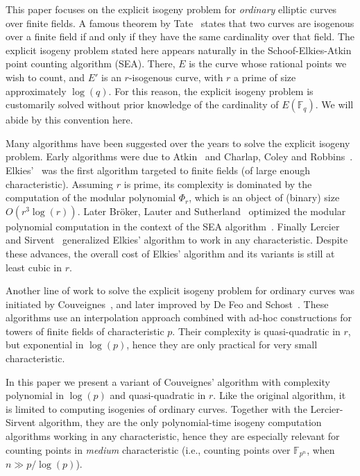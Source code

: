 \documentclass{lms}
\newcommand{\F}{\mathbb{F}}
\begin{document}
This paper focuses on the explicit isogeny problem for \emph{ordinary}
elliptic curves over finite fields. A famous theorem by Tate~\cite{tate1966endomorphisms} states
that two curves are isogenous over a finite field if and only if they
have the same cardinality over that field. The explicit isogeny
problem stated here appears naturally in the Schoof-Elkies-Atkin point
counting algorithm (SEA). There, $E$ is the curve whose rational points
we wish to count, and $E'$ is an $r$-isogenous curve, with $r$
a prime of size approximately $\log(q)$. For this reason, the explicit
isogeny problem is customarily solved without prior knowledge of the
cardinality of $E(\F_q)$. We will abide by this convention here.

Many algorithms
have been suggested over the years to solve the explicit isogeny
problem. Early algorithms were due to Atkin~\cite{atkin91} and
Charlap, Coley and
Robbins~\cite{charlap1991enumeration}. Elkies'~\cite{elkies98,Bostan}
was the first algorithm targeted to finite fields (of large enough
characteristic). Assuming $r$ is prime, its complexity is dominated by
the computation of the modular polynomial $\Phi_r$, which is an object
of (binary) size $O(r^3\log(r))$. Later Bröker, Lauter and
Sutherland~\cite{sutherland10:modpol} optimized the modular polynomial
computation in the context of the SEA
algorithm~\cite{sutherland2013evaluation}. Finally Lercier and Sirvent~\cite{lercier+sirvent08,1602.00244}
generalized Elkies' algorithm to work in any characteristic. Despite
these advances, the overall cost of Elkies' algorithm and its
variants is still at least cubic in $r$.

Another line of work to solve the explicit isogeny problem for ordinary curves was
initiated by Couveignes~\cite{couveignes94,couveignes96,couveignes00},
and later improved by De Feo and Schost~\cite{df10,df+schost12}. These
algorithms use an interpolation approach combined with ad-hoc
constructions for towers of finite fields of characteristic $p$. Their
complexity is quasi-quadratic in $r$, but exponential in $\log(p)$,
hence they are only practical for very small characteristic.

In this paper we present a variant of Couveignes' algorithm with
complexity polynomial in $\log(p)$ and quasi-quadratic in $r$. Like the original 
algorithm, it is limited to computing isogenies of ordinary curves. Together
with the Lercier-Sirvent algorithm, they are the only polynomial-time
isogeny computation algorithms working in any characteristic, hence
they are especially relevant for counting points in \emph{medium}
characteristic (i.e., counting points over $\F_{p^n}$, when
$n\gg p/\log (p)$).
\end{document}
